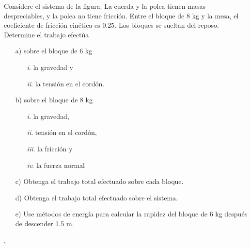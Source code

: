 \begin{frame}
    Considere el sistema de la
figura. La cuerda y la polea
tienen masas despreciables, y la
polea no tiene fricción. Entre el
bloque de 8 kg y la mesa,
el coeficiente de fricción cinética
es 0.25. Los bloques se
sueltan del reposo. Determine el trabajo efectúa \begin{itemize}
    \item[a)] sobre el bloque de 6 kg \begin{itemize}
        \item[\textit{i}.] la gravedad y
        \item[\textit{ii}.] la tensión en el cordón.
    \end{itemize}
    \item[b)] sobre el bloque de 8 kg \begin{itemize}
        \item[\textit{i}.] la gravedad,
        \item[\textit{ii}.] tensión en el cordón,
        \item[\textit{iii}.] la fricción y
        \item[\textit{iv}.] la fuerza normal
    \end{itemize}
    \item[c)] Obtenga el trabajo total efectuado sobre cada bloque.
    \item[d)] Obtenga el trabajo total efectuado sobre el sistema.
    \item[e)] Use métodos de energía para calcular la rapidez del bloque de 6 kg después de descender 1.5 m.
\end{itemize}, 



\end{frame}
    
